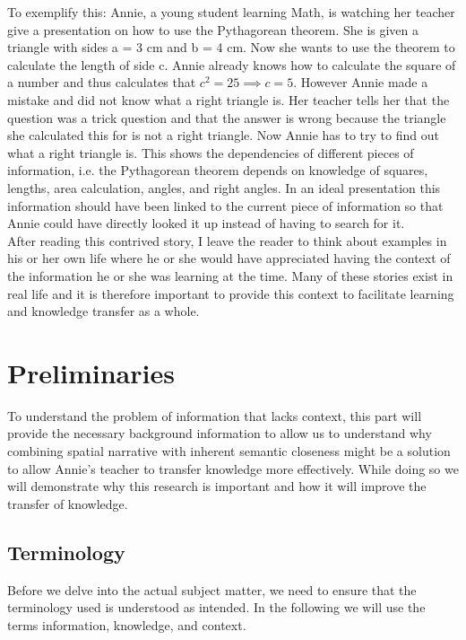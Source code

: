 \documentclass[twoside]{article}
\begin{document}
To exemplify this: Annie, a young student learning Math, is watching her teacher give a presentation on how to use the Pythagorean theorem. She is given a triangle with sides a = 3 cm and b = 4 cm. Now she wants to use the theorem to calculate the length of side c. Annie already knows how to calculate the square of a number and thus calculates that $c^2 = 25 \implies c = 5$. However Annie made a mistake and did not know what a right triangle is. Her teacher tells her that the question was a trick question and that the answer is wrong because the triangle she calculated this for is not a right triangle. Now Annie has to try to find out what a right triangle is. This shows the dependencies of different pieces of information, i.e. the Pythagorean theorem depends on knowledge of squares, lengths, area calculation, angles, and right angles. In an ideal presentation this information should have been linked to the current piece of information so that Annie could have directly looked it up instead of having to search for it.\\

After reading this contrived story, I leave the reader to think about examples in his or her own life where he or she would have appreciated having the context of the information he or she was learning at the time. Many of these stories exist in real life and it is therefore important to provide this context to facilitate learning and knowledge transfer as a whole. \\

\newpage
\section{Preliminaries}
\label{sec:preliminaries}

To understand the problem of information that lacks context, this part will provide the necessary background information to allow us to understand why combining spatial narrative with inherent semantic closeness might be a solution to allow Annie's teacher to transfer knowledge more effectively. While doing so we will demonstrate why this research is important and how it will improve the transfer of knowledge.\\

\subsection{Terminology}
\label{sec:terminology}

Before we delve into the actual subject matter, we need to ensure that the terminology used is understood as intended. In the following we will use the terms information, knowledge, and context.\\
\end{document}
